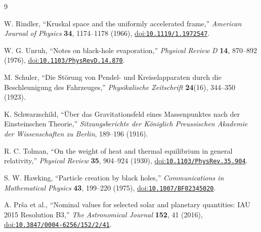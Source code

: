 \documentclass[12pt]{article}
\begin{document}
\begin{thebibliography}{9}
\small
{}
\raggedright
{}

W. Rindler,
``Kruskal space and the uniformly accelerated frame,''
\emph{American Journal of Physics} \textbf{34}, 1174--1178 (1966),
\href{https://doi.org/10.1119/1.1972547}{doi:\nolinkurl{10.1119/1.1972547}}.

W. G. Unruh,
``Notes on black-hole evaporation,''
\emph{Physical Review D} \textbf{14}, 870--892 (1976),
\href{https://doi.org/10.1103/PhysRevD.14.870}{doi:\nolinkurl{10.1103/PhysRevD.14.870}}.

M. Schuler,
``Die St\"orung von Pendel- und Kreiselapparaten durch die Beschleunigung des Fahrzeuges,''
\emph{Physikalische Zeitschrift} \textbf{24}(16), 344--350 (1923).

K. Schwarzschild,
``\"Uber das Gravitationsfeld eines Massenpunktes nach der Einsteinschen Theorie,''
\emph{Sitzungsberichte der K\"oniglich Preussischen Akademie der Wissenschaften zu Berlin}, 189--196 (1916).

R. C. Tolman,
``On the weight of heat and thermal equilibrium in general relativity,''
\emph{Physical Review} \textbf{35}, 904--924 (1930),
\href{https://doi.org/10.1103/PhysRev.35.904}{doi:\nolinkurl{10.1103/PhysRev.35.904}}.

S. W. Hawking,
``Particle creation by black holes,''
\emph{Communications in Mathematical Physics} \textbf{43}, 199--220 (1975),
\href{https://doi.org/10.1007/BF02345020}{doi:\nolinkurl{10.1007/BF02345020}}.

A. Pr\v{s}a et al.,
``Nominal values for selected solar and planetary quantities: IAU 2015 Resolution B3,''
\emph{The Astronomical Journal} \textbf{152}, 41 (2016),
\href{https://doi.org/10.3847/0004-6256/152/2/41}{doi:\nolinkurl{10.3847/0004-6256/152/2/41}}.

\end{thebibliography}
\end{document}
